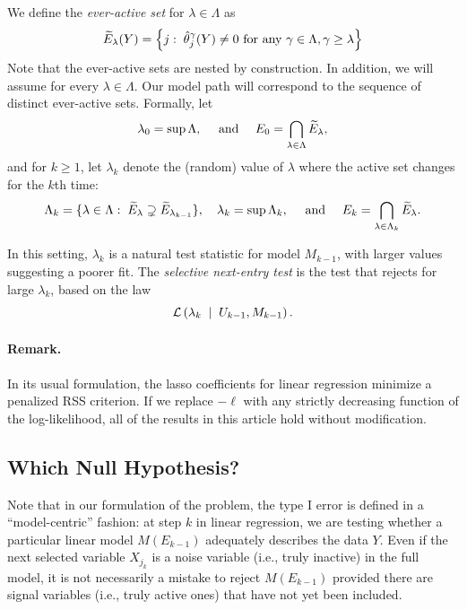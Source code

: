 \documentclass{article}
\begin{document}
We define the {\em ever-active set} for $\lambda\in\Lambda$ as
\begin{equation}
  \widetilde{E}_\lambda(Y) = \left\{j:\; \hat\theta_j^\gamma(Y) \neq 0 
    \text{ for any } \gamma\in \Lambda, \gamma \geq \lambda \right\}
\end{equation}
Note that the ever-active sets \smash{$\tE_\lambda$} are nested by construction. In addition, we will assume \smash{$|\tE_\lambda|<\infty$} for every $\lambda\in\Lambda$. Our model path will correspond to the sequence of distinct ever-active sets. Formally, let 
\[
\lambda_0=\sup \Lambda, \quad \text{ and } \quad 
E_0 = \bigcap_{\lambda\in \Lambda} \widetilde{E}_\lambda,
\]
and for $k\geq 1$, let $\lambda_k$ denote the (random) value of $\lambda$ where the active set changes for the $k$th time:
\begin{equation*}
  \Lambda_k = \{\lambda\in \Lambda:\; \widetilde{E}_\lambda \supsetneq \widetilde{E}_{\lambda_{k-1}}\},
  \quad
  \lambda_k = \sup\Lambda_k,
  \quad \text{ and } \quad
  E_k = \bigcap_{\lambda\in\Lambda_k} \widetilde{E}_{\lambda}.
\end{equation*}

In this setting, $\lambda_k$ is a natural test statistic for model $M_{k-1}$, with larger values suggesting a poorer fit. The {\em selective next-entry test} is the test that rejects for large $\lambda_k$, based on the law
\begin{equation*}
\mathcal{L}\left(\lambda_k \;\mid\; U_{k-1}, M_{k-1}\right).
\end{equation*}

\paragraph{Remark.} In its usual formulation, the lasso coefficients for linear regression minimize a penalized RSS criterion. If we replace $-\ell$ with any strictly decreasing function of the log-likelihood, all of the results in this article hold without modification.


\subsection{Which Null Hypothesis?}
\label{sec:whichnull}

Note that in our formulation of the problem, the type I error  is defined in a ``model-centric'' fashion: at step $k$ in linear regression, we are testing  whether a particular linear model $M(E_{k-1})$ adequately describes the data $Y$. Even if the next selected variable $X_{j_k}$ is a noise variable (i.e., truly inactive) in the full model, it is not necessarily a mistake to reject $M(E_{k-1})$ provided there are signal variables (i.e., truly active ones) that have not yet been included.
\end{document}
